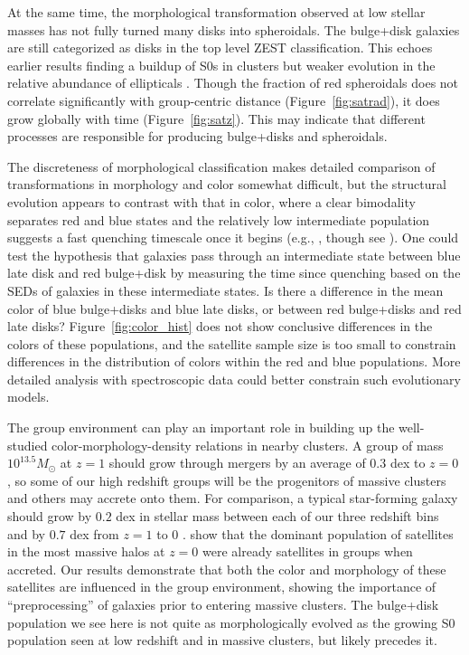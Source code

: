 \documentclass[12pt]{emulateapj}
\begin{document}
At the same time, the morphological transformation observed at low
stellar masses has not fully turned many disks into spheroidals. The
bulge+disk galaxies are still categorized as disks in the top level
ZEST classification.  This echoes earlier results finding a buildup of
S0s in clusters but weaker evolution in the relative abundance of
ellipticals \citep[e.g.,][]{Dressler1997}. Though the fraction of red
spheroidals does not correlate significantly with group-centric
distance (Figure~\ref{fig:satrad}), it does grow globally with time
(Figure~\ref{fig:satz}). This may indicate that different processes
are responsible for producing bulge+disks and spheroidals. 

The discreteness of morphological classification makes detailed
comparison of transformations in morphology and color somewhat
difficult, but the structural evolution appears to contrast with that
in color, where a clear bimodality separates red and blue states and
the relatively low intermediate population suggests a fast quenching
timescale once it begins (e.g., \citealt{Wetzel2012a}, though see
\citealt{Balogh2011}). One could test the hypothesis that galaxies pass through an
intermediate state between blue late disk and red bulge+disk by
measuring the time since quenching based on the SEDs of galaxies in
these intermediate states. Is there a difference in the mean color of
blue bulge+disks and blue late disks, or between red bulge+disks and
red late disks? Figure~\ref{fig:color_hist} does not show conclusive
differences in the colors of these populations, and the satellite
sample size is too small to constrain differences in the distribution
of colors within the red and blue populations. More detailed analysis
with spectroscopic data could better constrain such evolutionary
models.

The group environment can play an important role in building up the
well-studied color-morphology-density relations in nearby clusters. A
group of mass $10^{13.5} M_{\odot}$ at $z=1$ should grow through
mergers by an average of $0.3$ dex to $z=0$ \citep{Fakhouri2010}, so
some of our high redshift groups will be the progenitors of massive
clusters and others may accrete onto them. For comparison, a typical
star-forming galaxy should grow by $0.2$ dex in stellar mass between
each of our three redshift bins and by $0.7$ dex from $z=1$ to $0$
\citep{Elbaz2011}.  \citet{Wetzel2012b} show that the dominant
population of satellites in the most massive halos at $z=0$ were
already satellites in groups when accreted. Our results demonstrate
that both the color and morphology of these satellites are influenced
in the group environment, showing the importance of ``preprocessing''
of galaxies prior to entering massive clusters. The bulge+disk
population we see here is not quite as morphologically evolved as the
growing S0 population seen at low redshift and in massive clusters,
but likely precedes it.
 
\end{document}
